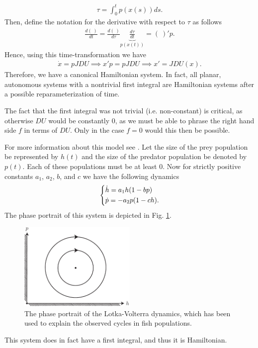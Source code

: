 \begin{ex}
\begin{align}
	\tau = \int_{0}^{t} p(x(s))ds.
\end{align}
Then, define the notation for the derivative with respect to $\tau$ as follows
 \begin{align}
	 \frac{d(\ )}{dt} = \frac{d(\ )}{d\tau} \underbrace{\frac{d\tau }{dt}}_{p(x(t))} = (\ )' p.
\end{align}
Hence, using this time-transformation we have
\begin{align}
	\dot{x} = pJDU \implies x'p = pJDU \implies \boxed{x' = JDU(x).}
\end{align}
Therefore, we have a canonical Hamiltonian system. In fact, all planar, autonomous systems with a nontrivial first integral are Hamiltonian systems after a possible reparameterization of time.
\end{ex}

\begin{remark}[]
	The fact that the first integral was not trivial (i.e. non-constant) is critical, as otherwise $DU$ would be constantly 0, as we must be able to phrase the right hand side $f$ in terms of $DU$. Only in the case $f=0$ would this then be possible.
\end{remark}

\begin{ex}
	For more information about this model see \cite{Lotka1925, Volterra1926}. Let the size of the prey population be represented by $h(t)$ and the size of the predator population be denoted by $p(t)$. Each of these populations must be at least 0. Now for strictly positive constants $a_1$, $a_2$, $b$, and $c$ we have the following dynamics
	\begin{align}
		\begin{dcases}
			\dot{h} = a_1 h(1- bp) \\
			\dot{p} = -a_2 p(1-ch).
		\end{dcases}
	\end{align}
	The phase portrait of this system is depicted in Fig. \ref{fig:lotka_volterra}.
	\begin{figure}[h!]
		\centering
		\includegraphics[width=0.5\textwidth]{figures/ch8/3lotka_volterra.pdf}
		\caption{The phase portrait of the Lotka-Volterra dynamics, which has been used to explain the observed cycles in fish populations.}
		\label{fig:lotka_volterra}
	\end{figure}

	This system does in fact have a first integral, and thus it is Hamiltonian.	
\end{ex}

